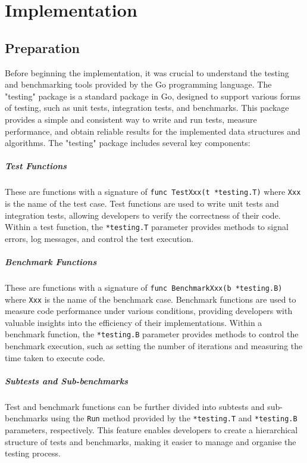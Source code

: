 \chapter{Implementation} %
\label{chap:implementation}

\section{Preparation}
\noindent
Before beginning the implementation, it was crucial to understand the testing and benchmarking tools provided by the Go programming language. The "testing" package is a standard package in Go, designed to support various forms of testing, such as unit tests, integration tests, and benchmarks. This package provides a simple and consistent way to write and run tests, measure performance, and obtain reliable results for the implemented data structures and algorithms.
The "testing" package includes several key components:

\paragraph{Test Functions}
These are functions with a signature of \lstinline{func TestXxx(t *testing.T)} where \lstinline{Xxx} is the name of the test case. Test functions are used to write unit tests and integration tests, allowing developers to verify the correctness of their code. Within a test function, the \lstinline{*testing.T} parameter provides methods to signal errors, log messages, and control the test execution.

\paragraph{Benchmark Functions}
These are functions with a signature of \lstinline{func BenchmarkXxx(b *testing.B)} where \lstinline{Xxx} is the name of the benchmark case. Benchmark functions are used to measure code performance under various conditions, providing developers with valuable insights into the efficiency of their implementations. Within a benchmark function, the \lstinline{*testing.B} parameter provides methods to control the benchmark execution, such as setting the number of iterations and measuring the time taken to execute code.

\paragraph{Subtests and Sub-benchmarks}
Test and benchmark functions can be further divided into subtests and sub-benchmarks using the \lstinline{Run} method provided by the \lstinline{*testing.T} and \lstinline{*testing.B} parameters, respectively. This feature enables developers to create a hierarchical structure of tests and benchmarks, making it easier to manage and organise the testing process.

